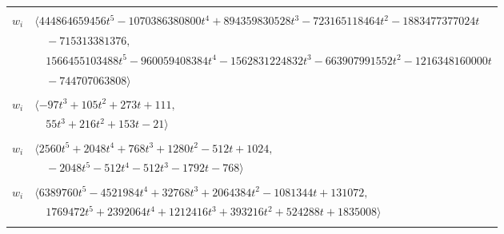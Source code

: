 \documentclass[11pt]{article}
\begin{document}
\begin{longtable}{@{}ll@{}}
\addlinespace[2pt]
\multicolumn{2}{@{}p{0.97\textwidth}@{}}{$i=54$, $D_i=67108864$, $\rho_{ij}$: $1{:}2, \allowbreak 2{:}1, \allowbreak 5{:}2, \allowbreak 9{:}2, \allowbreak 14{:}1, \allowbreak 15{:}1, \allowbreak 20{:}1, \allowbreak 22{:}2, \allowbreak 25{:}2, \allowbreak 28{:}2, \allowbreak 33{:}1, \allowbreak 34{:}2, \allowbreak 39{:}1, \allowbreak 46{:}2, \allowbreak 53{:}1, \allowbreak 61{:}1$}\\
$w_i$ & $\langle 444864659456t^{5}-1070386380800t^{4}+894359830528t^{3}-723165118464t^{2}-1883477377024t$\\
 & $\quad -715313381376,$\\
 & $\quad 1566455103488t^{5}-960059408384t^{4}-1562831224832t^{3}-663907991552t^{2}-1216348160000t$\\
 & $\quad -744707063808\rangle$\\
\addlinespace[2pt]
\multicolumn{2}{@{}p{0.97\textwidth}@{}}{$i=55$, $D_i=16$, $\rho_{ij}$: $2{:}1, \allowbreak 6{:}2, \allowbreak 14{:}1, \allowbreak 15{:}2, \allowbreak 46{:}2, \allowbreak 50{:}2$}\\
$w_i$ & $\langle -97t^{3}+105t^{2}+273t+111,$\\
 & $\quad 55t^{3}+216t^{2}+153t-21\rangle$\\
\addlinespace[2pt]
\multicolumn{2}{@{}p{0.97\textwidth}@{}}{$i=56$, $D_i=256$, $\rho_{ij}$: $3{:}2, \allowbreak 22{:}2, \allowbreak 39{:}1, \allowbreak 44{:}1, \allowbreak 45{:}1, \allowbreak 47{:}2, \allowbreak 50{:}2$}\\
$w_i$ & $\langle 2560t^{5}+2048t^{4}+768t^{3}+1280t^{2}-512t+1024,$\\
 & $\quad -2048t^{5}-512t^{4}-512t^{3}-1792t-768\rangle$\\
\addlinespace[2pt]
\multicolumn{2}{@{}p{0.97\textwidth}@{}}{$i=57$, $D_i=32768$, $\rho_{ij}$: $2{:}1, \allowbreak 5{:}1, \allowbreak 8{:}2, \allowbreak 18{:}1, \allowbreak 27{:}1, \allowbreak 28{:}1, \allowbreak 31{:}2, \allowbreak 36{:}2, \allowbreak 38{:}2, \allowbreak 67{:}1, \allowbreak 68{:}2$}\\
$w_i$ & $\langle 6389760t^{5}-4521984t^{4}+32768t^{3}+2064384t^{2}-1081344t+131072,$\\
 & $\quad 1769472t^{5}+2392064t^{4}+1212416t^{3}+393216t^{2}+524288t+1835008\rangle$\\
\addlinespace[2pt]
\multicolumn{2}{@{}p{0.97\textwidth}@{}}{$i=58$, $D_i=256$, $\rho_{ij}$: $9{:}1, \allowbreak 12{:}2, \allowbreak 16{:}1, \allowbreak 24{:}2, \allowbreak 25{:}1, \allowbreak 28{:}1, \allowbreak 31{:}2, \allowbreak 37{:}2, \allowbreak 40{:}1$}\\

\end{longtable}
\end{document}
